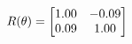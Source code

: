 \documentclass[preview]{standalone}
\begin{document}
\begin{align*}
\special{dvisvgm:raw <g id='unique000'>}R(\theta) = \begin{bmatrix}1.00 & -0.09\\0.09 & 1.00\end{bmatrix}\special{dvisvgm:raw </g>}
\end{align*}
\end{document}
